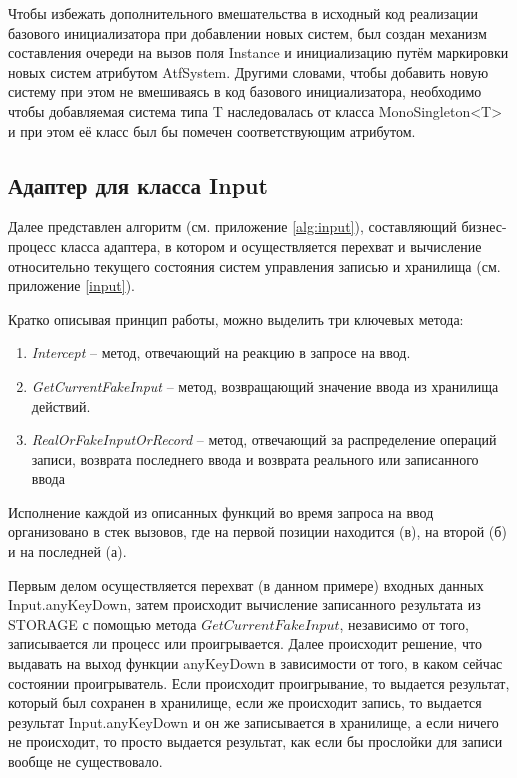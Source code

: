 Чтобы избежать дополнительного вмешательства в исходный код реализации базового инициализатора при добавлении новых систем, был создан механизм составления очереди на вызов поля Instance и инициализацию путём маркировки новых систем атрибутом AtfSystem. Другими словами, чтобы добавить новую систему при этом не вмешиваясь в код базового инициализатора, необходимо чтобы добавляемая система типа T наследовалась от класса MonoSingleton<T> и при этом её класс был бы помечен соответствующим атрибутом.

\subsection{Адаптер для класса Input}
Далее представлен алгоритм (см. приложение \ref{alg:input}), составляющий бизнес-процесс класса адаптера, в котором и осуществляется перехват и вычисление относительно текущего состояния систем управления записью и хранилища (см. приложение \ref{input}).

\newpage
Кратко описывая принцип работы, можно выделить три ключевых метода: 
\begin{enumerate}
	\item \textit{Intercept} -- метод, отвечающий на реакцию в запросе на ввод.
	\item \textit{GetCurrentFakeInput} -- метод, возвращающий значение ввода из хранилища действий.
	\item \textit{RealOrFakeInputOrRecord} -- метод, отвечающий за распределение операций записи, возврата последнего ввода и возврата реального или записанного ввода
\end{enumerate}

Исполнение каждой из описанных функций во время запроса на ввод организовано в стек вызовов, где на первой позиции находится (в), на второй (б) и на последней (а).

Первым делом осуществляется перехват (в данном примере) входных данных Input.anyKeyDown, затем происходит вычисление записанного результата из STORAGE с помощью метода $GetCurrentFakeInput$, независимо от того, записывается ли процесс или проигрывается. Далее происходит решение, что выдавать на выход функции anyKeyDown в зависимости от того, в каком сейчас состоянии проигрыватель. Если происходит проигрывание, то выдается результат, который был сохранен в хранилище, если же происходит запись, то выдается результат Input.anyKeyDown и он же записывается в хранилище, а если ничего не происходит, то просто выдается результат, как если бы прослойки для записи вообще не существовало.

